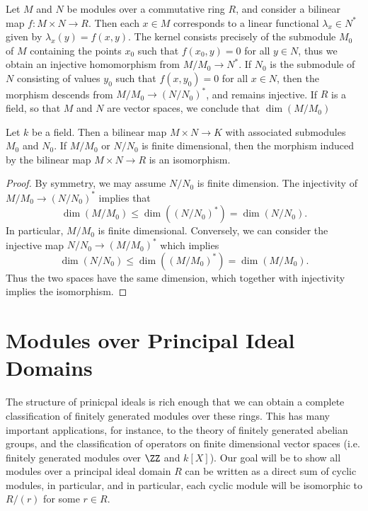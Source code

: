 Let $M$ and $N$ be modules over a commutative ring $R$, and consider a bilinear map $f: M \times N \to R$. Then each $x \in M$ corresponds to a linear functional $\lambda_x \in N^*$ given by $\lambda_x(y) = f(x,y)$. The kernel consists precisely of the submodule $M_0$ of $M$ containing the points $x_0$ such that $f(x_0,y) = 0$ for all $y \in N$, thus we obtain an injective homomorphism from $M/M_0 \to N^*$. If $N_0$ is the submodule of $N$ consisting of values $y_0$ such that $f(x,y_0) = 0$ for all $x \in N$, then the morphism descends from $M/M_0 \to (N/N_0)^*$, and remains injective. If $R$ is a field, so that $M$ and $N$ are vector spaces, we conclude that $\dim(M/M_0)$

\begin{lemma}
    Let $k$ be a field. Then a bilinear map $M \times N \to K$ with associated submodules $M_0$ and $N_0$. If $M/M_0$ or $N/N_0$ is finite dimensional, then the morphism induced by the bilinear map $M \times N \to R$ is an isomorphism.
\end{lemma}
\begin{proof}
    By symmetry, we may assume $N/N_0$ is finite dimension. The injectivity of $M/M_0 \to (N/N_0)^*$ implies that
    \[ \dim(M/M_0) \leq \dim((N/N_0)^*) = \dim(N/N_0). \]
    In particular, $M/M_0$ is finite dimensional. Conversely, we can consider the injective map $N/N_0 \to (M/M_0)^*$ which implies
    \[ \dim(N/N_0) \leq \dim((M/M_0)^*) = \dim(M/M_0). \]
    Thus the two spaces have the same dimension, which together with injectivity implies the isomorphism.
\end{proof}

\section{Modules over Principal Ideal Domains}

The structure of prinicpal ideals is rich enough that we can obtain a complete classification of finitely generated modules over these rings. This has many important applications, for instance, to the theory of finitely generated abelian groups, and the classification of operators on finite dimensional vector spaces (i.e. finitely generated modules over $\ZZ$ and $k[X]$). Our goal will be to show all modules over a principal ideal domain $R$ can be written as a direct sum of cyclic modules, in particular, and in particular, each cyclic module will be isomorphic to $R/(r)$ for some $r \in R$.

